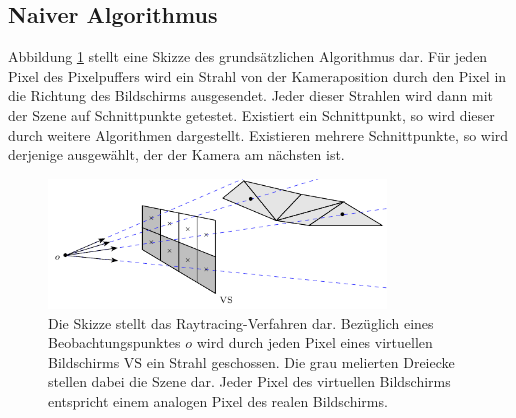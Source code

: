 \documentclass[crop=false]{standalone}
\begin{document}
    \subsection{Naiver Algorithmus} %
    \label{sub:naiver_algorithmus}
      Abbildung \ref{fig:raytracing} stellt eine Skizze des grundsätzlichen Algorithmus dar.
      Für jeden Pixel des Pixelpuffers wird ein Strahl von der Kameraposition durch den Pixel in die Richtung des Bildschirms ausgesendet.
      Jeder dieser Strahlen wird dann mit der Szene auf Schnittpunkte getestet.
      Existiert ein Schnittpunkt, so wird dieser durch weitere Algorithmen dargestellt.
      Existieren mehrere Schnittpunkte, so wird derjenige ausgewählt, der der Kamera am nächsten ist.
      \begin{figure}
        \center
        \includegraphics[width=0.8\textwidth]{images/ray_tracing_scheme.pdf}
        \caption{%
          Die Skizze stellt das Raytracing-Verfahren dar.
          Bezüglich eines Beobachtungspunktes $o$ wird durch jeden Pixel eines virtuellen Bildschirms $\mathrm{VS}$ ein Strahl geschossen.
          Die grau melierten Dreiecke stellen dabei die Szene dar.
          Jeder Pixel des virtuellen Bildschirms entspricht einem analogen Pixel des realen Bildschirms.
        }
        \label{fig:raytracing}
      \end{figure}
\end{document}
